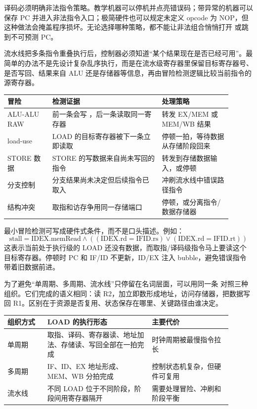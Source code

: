 译码必须明确非法指令策略。教学机器可以停机并点亮错误码；带异常的机器可以保存 PC 并进入非法指令入口；极简硬件也可以规定未定义 opcode 为 NOP，但这种做法会掩盖程序损坏。无论选择哪种策略，都不能让非法组合悄悄打开  或跳到不可预测 PC。

流水线把多条指令重叠执行后，控制器必须知道“某个结果现在是否已经可用”。最简单的办法不是先设计复杂乱序执行，而是在流水级寄存器里保留目标寄存器号、是否写回、结果来自 ALU 还是存储器等信息，再由冒险检测逻辑比较当前指令的源寄存器。

\begin{longtable}{L{0.18\linewidth}L{0.44\linewidth}L{0.28\linewidth}}
\toprule
冒险 & 检测证据 & 处理策略 \\
\midrule
ALU-ALU RAW & 前一条会写 ，后一条读取同一寄存器 & 转发 EX/MEM 或 MEM/WB 结果 \\
load-use & LOAD 的目标寄存器被下一条立即读取 & 停顿一拍，等待数据从存储阶段回来 \\
STORE 数据 & STORE 的写数据来自尚未写回的指令 & 转发到存储数据输入，或停顿 \\
分支控制 & 分支结果尚未决定但后续指令已取入 & 冲刷流水线中错误路径指令 \\
结构冲突 & 取指和访存争用同一存储端口 & 停顿，或分离指令/数据存储器 \\
\bottomrule
\end{longtable}

最小冒险检测可写成硬件式条件，而不是口头描述。例如：
\[
\text{stall} = \text{IDEX.memRead}\land((\text{IDEX.rd}=\text{IFID.rs})\lor(\text{IDEX.rd}=\text{IFID.rt}))
\]
这表示当前处于执行级的 LOAD 还没有数据，而取指/译码级指令马上要读这个目标寄存器。停顿时 PC 和 IF/ID 不更新，ID/EX 注入 bubble，避免错误指令带着旧数据前进。

为了避免“单周期、多周期、流水线”只停留在名词层面，可以用同一条  对照三种组织。它们完成的语义相同：读 R2，加立即数形成地址，访问存储器，把数据写回 R1。区别在于资源是否复用、状态保存在哪里、关键路径由谁决定。

\begin{longtable}{L{0.16\linewidth}L{0.42\linewidth}L{0.32\linewidth}}
\toprule
组织方式 & LOAD 的执行形态 & 主要代价 \\
\midrule
单周期 & 取指、译码、寄存器读、地址加法、存储读、写回全部在一拍完成 & 时钟周期被最慢指令拉长 \\
多周期 & IF、ID、EX 地址形成、MEM、WB 分拍完成 & 控制状态机复杂，但硬件可复用 \\
流水线 & 不同 LOAD 位于不同阶段，阶段间用寄存器隔开 & 需要处理冒险、冲刷和阶段平衡 \\
\bottomrule
\end{longtable}

